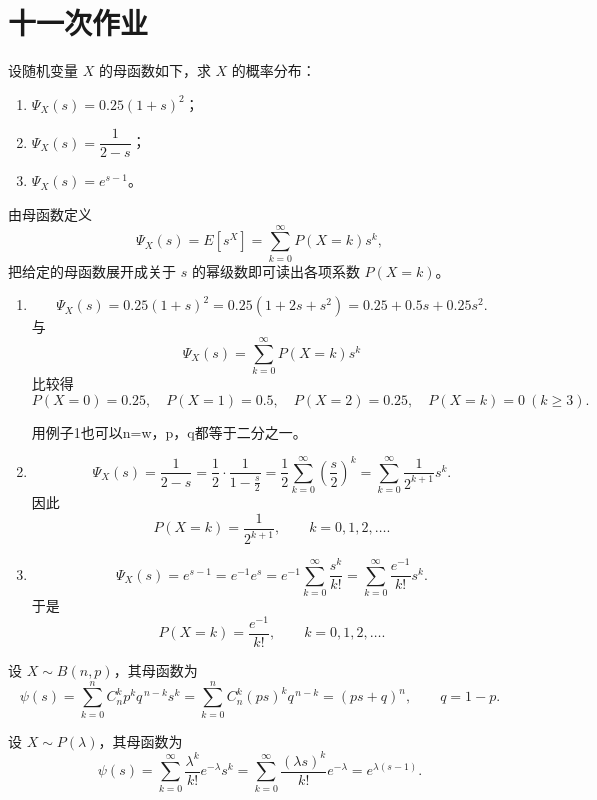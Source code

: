 \section{十一次作业}
\begin{homework}[4.14]
设随机变量 $X$ 的母函数如下，求 $X$ 的概率分布：
\begin{enumerate}[(1)]
  \item $\Psi_X(s)=0.25(1+s)^2$；
  \item $\Psi_X(s)=\dfrac{1}{2-s}$；
  \item $\Psi_X(s)=e^{s-1}$。
\end{enumerate}
\end{homework}
\begin{solution}
由母函数定义
\[
\Psi_X(s)=E[s^X]=\sum_{k=0}^\infty P(X=k)s^k,
\]
把给定的母函数展开成关于 $s$ 的幂级数即可读出各项系数 $P(X=k)$。

\begin{enumerate}[(1)]
\item
\[
\Psi_X(s)=0.25(1+s)^2
       =0.25(1+2s+s^2)
       =0.25+0.5s+0.25s^2.
\]
与
\[
\Psi_X(s)=\sum_{k=0}^\infty P(X=k)s^k
\]
比较得
\[
P(X=0)=0.25,\quad P(X=1)=0.5,\quad P(X=2)=0.25,\quad P(X=k)=0\ (k\ge3).
\]
\begin{dxtips}
    用例子1也可以n=w，p，q都等于二分之一。
\end{dxtips}
\item
\[
\Psi_X(s)=\frac{1}{2-s}
=\frac{1}{2}\cdot\frac{1}{1-\frac{s}{2}}
=\frac{1}{2}\sum_{k=0}^\infty\left(\frac{s}{2}\right)^k
=\sum_{k=0}^\infty\frac{1}{2^{k+1}}s^k.
\]
因此
\[
P(X=k)=\frac{1}{2^{k+1}},\qquad k=0,1,2,\dots.
\]

\item
\[
\Psi_X(s)=e^{s-1}=e^{-1}e^s
=e^{-1}\sum_{k=0}^\infty\frac{s^k}{k!}
=\sum_{k=0}^\infty\frac{e^{-1}}{k!}s^k.
\]
于是
\[
P(X=k)=\frac{e^{-1}}{k!},\qquad k=0,1,2,\dots.
\]
\end{enumerate}
\end{solution}
\begin{example}[二项分布的母函数]
设 $X \sim B(n,p)$，其母函数为
\[
\psi(s)
= \sum_{k=0}^{n} C_n^k p^{k} q^{\,n-k} s^{k}
= \sum_{k=0}^{n} C_n^k (ps)^{k} q^{\,n-k}
= (ps+q)^n,\qquad q = 1-p.
\]
\end{example}

\begin{example}[泊松分布的母函数]
设 $X \sim P(\lambda)$，其母函数为
\[
\psi(s)
= \sum_{k=0}^{\infty} \frac{\lambda^{k}}{k!} e^{-\lambda} s^{k}
= \sum_{k=0}^{\infty} \frac{(\lambda s)^{k}}{k!} e^{-\lambda}
= e^{\lambda(s-1)}.
\]
\end{example}

